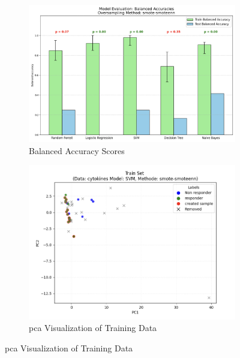 \documentclass[12pt,a4paper]{report}
\begin{document}
\begin{figure}[h!] 
    \centering 

    \begin{subfigure}[b]{0.48\textwidth}
        \centering
        \includegraphics[width=\textwidth]{images/smote_een_fig1a.png} 
        \caption{Balanced Accuracy Scores} 
        \label{fig:smote_enn_fig1a}
    \end{subfigure}
    \hfill
    \begin{subfigure}[b]{0.48\textwidth}
        \centering
        \includegraphics[width=0.9\linewidth]{images/smote_een_fig1b.png}
        \caption{\gls{pca} Visualization of Training Data} 
        \label{fig:smote_enn_fig1b} 
    \end{subfigure}

    \vspace{1em}


\end{figure}
\end{document}

